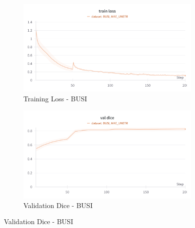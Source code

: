 \begin{figure}[htbp]
    \begin{subfigure}{0.45\textwidth}
        \centering
        \includegraphics[width=\linewidth]{images/mae_unetr/busi_train_loss.png}
        \caption{Training Loss - BUSI}
    \end{subfigure}
    \hfill
    \begin{subfigure}{0.45\textwidth}
        \centering
        \includegraphics[width=\linewidth]{images/mae_unetr/busi_val_dice.png}
        \caption{Validation Dice - BUSI}
    \end{subfigure}
    

\end{figure}
